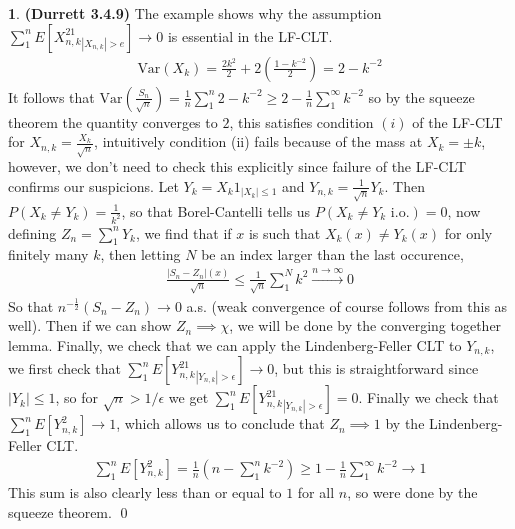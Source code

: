 \documentclass{article}
\theoremstyle{definition}
\newtheorem{pb}{}
\newcommand{\abs}[1]{\left\vert#1\right\vert}
\newcommand{\var}{\text{Var}}
\begin{document}
    \begin{pb}\textbf{(Durrett 3.4.9)}
        The example shows why the assumption \(\sum_1^nE[X_{n,k}^21_{\abs{X_{n,k}}>e}] \to 0\) is essential in the LF-CLT.
        \begin{align*}
            \var(X_k) = \frac{2k^2}{2} + 2(\frac{1 - k^{-2}}{2}) = 2 - k^{-2}
        \end{align*}
        It follows that \(\var\left(\frac{S_n}{\sqrt{n}}\right) = \frac{1}{n}\sum_1^n 2 - k^{-2} \geq 2 - \frac{1}{n}\sum_1^\infty k^{-2}\) so by the squeeze theorem the quantity converges to \(2\), this satisfies condition \((i)\) of the LF-CLT for \(X_{n,k} = \frac{X_k}{\sqrt{n}}\), intuitively condition (ii) fails because of the mass at \(X_k = \pm k\), however, we don't need to check this explicitly since failure of the LF-CLT confirms our suspicions. Let \(Y_k = X_k1_{\abs{X_k} \leq 1}\) and \(Y_{n,k} = \frac{1}{\sqrt{n}}Y_k\). Then \(P(X_k \neq Y_k) = \frac{1}{k^2}\), so that Borel-Cantelli tells us \(P(X_k \neq Y_k \text{ i.o.}) = 0\), now defining \(Z_n = \sum_1^n Y_k\), we find that if \(x\) is such that \(X_k(x) \neq Y_k(x)\) for only finitely many \(k\), then letting \(N\) be an index larger than the last occurence,
        \begin{align*}
            \frac{\abs{S_n - Z_n}(x)}{\sqrt{n}} \leq \frac{1}{\sqrt{n}} \sum_1^N k^2 \overset{n\to\infty}{\longrightarrow} 0
        \end{align*}
        So that \(n^{-\frac12}(S_n - Z_n) \to 0\) a.s. (weak convergence of course follows from this as well). Then if we can show \(Z_n \implies \chi\), we will be done by the converging together lemma. Finally, we check that we can apply the Lindenberg-Feller CLT to \(Y_{n,k}\), we first check that \(\sum_1^n E[Y_{n,k}^21_{\abs{Y_{n,k}}>\epsilon}] \to 0\), but this is straightforward since \(\abs{Y_k} \leq 1\), so for \(\sqrt{n} > 1/\epsilon\) we get \(\sum_1^n E[Y_{n,k}^21_{\abs{Y_{n,k}}>\epsilon}] =  0\). Finally we check that \(\sum_1^n E[Y_{n,k}^2] \to 1\), which allows us to conclude that \(Z_n \implies 1\) by the Lindenberg-Feller CLT.
        \begin{align*}
            \sum_1^n E[Y_{n,k}^2] = \frac{1}{n}\left(n - \sum_1^n k^{-2}\right) \geq 1 - \frac{1}{n}\sum_1^\infty k^{-2} \to 1
        \end{align*}
        This sum is also clearly less than or equal to \(1\) for all \(n\), so were done by the squeeze theorem.
        \qed
    \end{pb}
\end{document}
